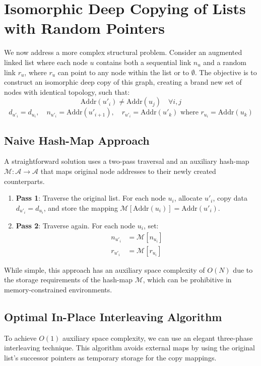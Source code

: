 \documentclass[10pt,journal,compsoc]{IEEEtran}
\begin{document}
\section{Isomorphic Deep Copying of Lists with Random Pointers}
We now address a more complex structural problem. Consider an augmented linked list where each node $u$ contains both a sequential link $n_u$ and a random link $r_u$, where $r_u$ can point to any node within the list or to $\emptyset$. The objective is to construct an isomorphic deep copy of this graph, creating a brand new set of nodes with identical topology, such that:
\[ \text{Addr}(u'_i) \neq \text{Addr}(u_j) \quad \forall i, j \]
 \[ d_{u'_i} = d_{u_i}, \quad n_{u'_i} = \text{Addr}(u'_{i+1}), \quad r_{u'_i} = \text{Addr}(u'_k) \text{ where } r_{u_i} = \text{Addr}(u_k) \]

\subsection{Naive Hash-Map Approach}
A straightforward solution uses a two-pass traversal and an auxiliary hash-map $\mathcal{M}: \mathcal{A} \to \mathcal{A}$ that maps original node addresses to their newly created counterparts.
\begin{enumerate}
\item \textbf{Pass 1}: Traverse the original list. For each node $u_i$, allocate $u'_i$, copy data $d_{u'_i} = d_{u_i}$, and store the mapping $\mathcal{M}[\text{Addr}(u_i)] = \text{Addr}(u'_i)$.
\item \textbf{Pass 2}: Traverse again. For each node $u_i$, set:
\begin{align*}
n_{u'_i} & = \mathcal{M}[n_{u_i}] \\
r_{u'_i} & = \mathcal{M}[r_{u_i}]
\end{align*}
\end{enumerate}
While simple, this approach has an auxiliary space complexity of $O(N)$ due to the storage requirements of the hash-map $\mathcal{M}$, which can be prohibitive in memory-constrained environments.

\subsection{Optimal In-Place Interleaving Algorithm}
To achieve $O(1)$ auxiliary space complexity, we can use an elegant three-phase interleaving technique. This algorithm avoids external maps by using the original list's successor pointers as temporary storage for the copy mappings.
\end{document}
